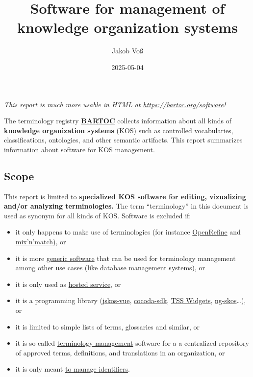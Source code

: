\documentclass[
  DIV=10]{article}
\title{Software for management of knowledge organization systems}
\author{Jakob Voß}
\affil{%
                  Verbundzentrale des GBV (VZG)
              }
\date{2025-05-04}
\providecommand{\tightlist}{%
  \setlength{\itemsep}{0pt}\setlength{\parskip}{0pt}}
\begin{document}
\maketitle


\large

\emph{This report is much more usable in HTML at
\url{https://bartoc.org/software}!} \vspace*{20mm}

The terminology registry \textbf{\href{https://bartoc.org/}{BARTOC}}
collects information about all kinds of \textbf{knowledge organization
systems} (KOS) such as controlled vocabularies, classifications,
ontologies, and other semantic artifacts. This report summarizes
information about \hyperref[kos-software]{software for KOS management}.

\subsection{Scope}\label{scope}

This report is limited to \textbf{\hyperref[kos-software]{specialized
KOS software} for editing, vizualizing and/or analyzing terminologies.}
The term ``terminology'' in this document is used as synonym for all
kinds of KOS. Software is excluded if:

\begin{itemize}
\tightlist
\item
  it only happens to make use of terminologies (for instance
  \href{https://openrefine.org/}{OpenRefine} and
  \href{https://mix-n-match.toolforge.org/}{mix'n'match}), or
\item
  it is more \hyperref[generic-software]{generic software} that can be
  used for terminology management among other use cases (like database
  management systems), or
\item
  it is only used as \hyperref[hosted-services]{hosted service}, or
\item
  it is a programming library
  (\href{https://github.com/gbv/jskos-vue/}{jskos-vue},
  \href{https://github.com/gbv/cocoda-sdk/}{cocoda-sdk},
  \href{https://github.com/ts4nfdi/terminology-service-suite}{TSS
  Widgets}, \href{http://gbv.github.io/ng-skos/}{ng-skos}\ldots), or
\item
  it is limited to simple lists of terms, glossaries and similar, or
\item
  it is so called \hyperref[terminology-management]{terminology
  management} software for a a centralized repository of approved terms,
  definitions, and translations in an organization, or
\item
  it is only meant \hyperref[identifier-systems]{to manage identifiers}.
\end{itemize}
\end{document}
